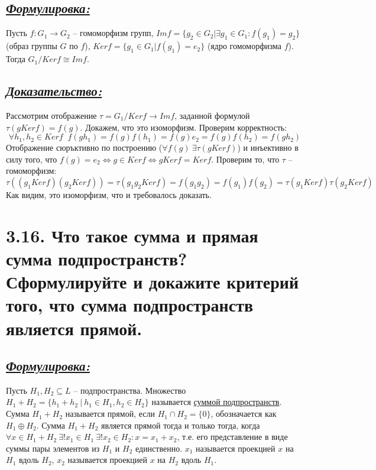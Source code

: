 \documentclass{article}
\begin{document}
\subsection*{\Large \underline{\textit{Формулировка: }}}

Пусть $f : G_1 \rightarrow G_2$ -- гомоморфизм групп,
\newline $Imf = \{g_2 \in G_2 | \exists g_1 \in G_1 : f(g_1) = g_2\}$ (образ группы $G$ по $f$), 
\newline $Kerf = \{g_1 \in G_1 | f(g_1) = e_2\}$ (ядро гомоморфизма $f$).
\newline Тогда $G_1/Kerf \cong Imf$.

\subsection*{\Large \underline{\textit{Доказательство: }}}

Рассмотрим отображение $\tau = G_1 / Kerf \rightarrow Imf$, заданной формулой $\tau(gKerf) = f(g)$. Докажем, что это изоморфизм.
\newline Проверим корректность:
$$ \forall h_1, h_2 \in Kerf \;\; f(gh_1) = f(g)f(h_1) = f(g)e_2 = f(g)f(h_2) = f(gh_2) $$
Отображение сюръктивно по построению ($\forall f(g) \: \exists \tau(gKerf)$) и инъективно в силу того, что $f(g) = e_2 \Leftrightarrow g\in Kerf \Leftrightarrow gKerf = Kerf$.
\newline Проверим то, что $\tau$ -- гомоморфизм:
$$
\tau((g_1Kerf)(g_2Kerf)) = \tau(g_1g_2Kerf) = f(g_1g_2) = f(g_1)f(g_2) = \tau(g_1Kerf)\tau(g_2Kerf)
$$
Как видим, это изоморфизм, что и требовалось доказать.

\section*{\LARGE 3.16. Что такое сумма и прямая сумма подпространств? Сформулируйте и докажите критерий того, что сумма подпространств является прямой. }
\subsection*{\Large \underline{\textit{Формулировка: }}}
Пусть $H_1, H_2 \subseteq L$ -- подпространства. Множество $H_1 + H_2 = \{h_1 + h_2 \:|\: h_1 \in H_1, h_2 \in H_2\}$ называется \underline{суммой подпространств}.
\newline Сумма $H_1 + H_2$ называется прямой, если $H_1 \cap H_2 = \{0\}$, обозначается как $H_1 \oplus H_2$.
\newline Сумма $H_1 + H_2$ является прямой тогда и только тогда, когда 
\newline $\forall x \in H_1 + H_2 \: \exists!x_1 \in H_1 \: \exists!x_2 \in H_2 : x = x_1 + x_2$, т.е. его представление в виде суммы пары элементов из $H_1$ и $H_2$ единственно. $x_1$ называется проекцией $x$ на $H_1$ вдоль $H_2$, $x_2$ называется проекцией $x$ на $H_2$ вдоль $H_1$.
\end{document}

